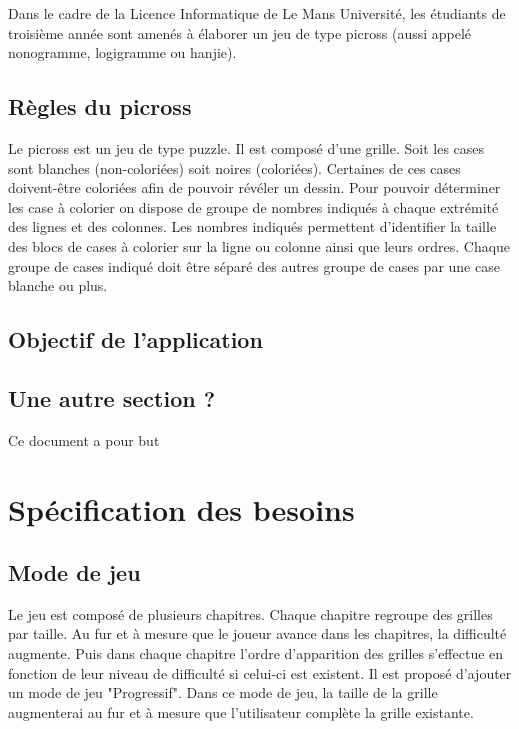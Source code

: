 \documentclass{report}
\begin{document}
		Dans le cadre de la Licence Informatique de Le Mans Université, les étudiants de troisième année sont amenés à élaborer un jeu de type picross (aussi appelé nonogramme, logigramme ou hanjie).
	
	\section{Règles du picross}
		Le picross est un jeu de type puzzle. Il est composé d'une grille. Soit les cases sont blanches (non-coloriées) soit noires (coloriées). 	
		Certaines de ces cases doivent-être coloriées afin de pouvoir révéler un dessin. Pour pouvoir déterminer les case à colorier on dispose de groupe de nombres indiqués à chaque extrémité des lignes et des colonnes.
		\newline
		Les nombres indiqués permettent d'identifier la taille des blocs de cases à colorier sur la ligne ou colonne ainsi que leurs ordres.
		\newline
		Chaque groupe de cases indiqué doit être séparé des autres groupe de cases par une case blanche ou plus.

	\section{Objectif de l'application}		
		
	\section{Une autre section ?}		
		
		Ce document a pour but



\chapter{Spécification des besoins}

	\section{Mode de jeu}
			Le jeu est composé de plusieurs chapitres. Chaque chapitre regroupe des grilles par taille. Au fur et à mesure que le joueur avance dans les chapitres, la difficulté augmente.
			\newline
			Puis dans chaque chapitre l'ordre d'apparition des grilles s'effectue en fonction de leur niveau de difficulté si celui-ci est existent.
			Il est proposé d'ajouter un mode de jeu "Progressif". Dans ce mode de jeu, la taille de la grille augmenterai au fur et à mesure que l'utilisateur complète la grille existante.
\end{document}
